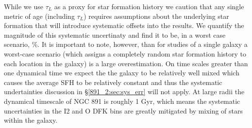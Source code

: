 


While we use $\tau_L$ as a proxy for star formation history we caution
that any single metric of age (including $\tau_L$) requires
assumptions about the underlying star formation that will introduce
systematic offsets into the results. We quantify the magnitude of this
systematic uncertinaty and find it to be, in a worst case scenario,
\%. It is important to note, however, than for studies of a
single galaxy a worst-case scenario (which assigns a completely random
star formation history to each location in the galaxy) is a large
overestimation. On time scales greater than one dynamical time we
expect the the galaxy to be relatively well mixed which causes the
average SFH to be relatively constant and thus the systematic
undertainties discussion in \S\ref{891_2:sec:sys_err} will not apply. At
large radii the dynamical timescale of NGC 891 is roughly 1 Gyr, which
means the systematic uncertainties in the I2 and O DFK bins are
greatly mitigated by mixing of stars within the galaxy.

